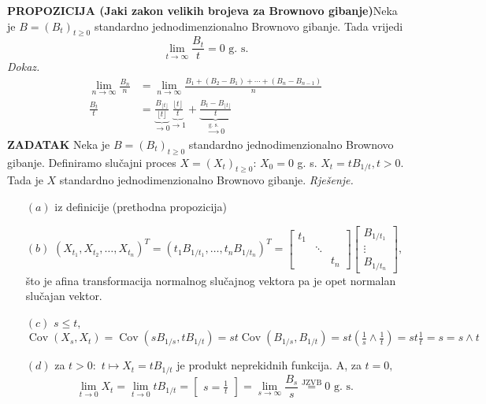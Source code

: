 \documentclass{article}
\newcommand{\Cov}{\operatorname{Cov}}
\begin{document}
\textbf{PROPOZICIJA (Jaki zakon velikih brojeva za Brownovo gibanje)}\newline Neka je \(B=(B_t)_{t\ge0}\) standardno jednodimenzionalno Brownovo gibanje. Tada vrijedi \[\lim_{t\to\infty}\frac{B_t}t=0\text{ g. s.}\]
\textit{Dokaz.} \[\begin{aligned}\lim_{n\to\infty}\frac{B_n}n&=\lim_{n\to\infty}\frac{B_1+(B_2-B_1)+\cdots+(B_n-B_{n-1})}n\\\frac{B_t}t&=\underbrace{\frac{B_{\lfloor t\rfloor}}{\lfloor t\rfloor}}_{\to0}\underbrace{\frac{\lfloor t\rfloor}t}_{\to1}+\underbrace{\frac{B_t-B_{\lfloor t\rfloor}}t}_{\overset{\text{g. s.}}{\longrightarrow}0
}\end{aligned}\]
\textbf{ZADATAK}\newline
Neka je \(B=(B_t)_{t\ge0}\) standardno jednodimenzionalno Brownovo gibanje. Definiramo slučajni proces \(X=(X_t)_{t\ge0}\): \(X_0=0\) g. s. \(X_t=tB_{1/t},t>0.\) Tada je \(X\) standardno jednodimenzionalno Brownovo gibanje.\newline\newline
\textit{Rješenje.}
\begin{enumerate}
    \item[\((a)\)] iz definicije (prethodna propozicija)
    \item[\((b)\)] \((X_{t_1},X_{t_2},\ldots,X_{t_n})^T=(t_1B_{1/t_1},\ldots,t_nB_{1/t_n})^T=\begin{bmatrix}t_1&&\\&\ddots&\\&&t_n\end{bmatrix}\begin{bmatrix}B_{1/t_1}\\\vdots\\B_{1/t_n}\end{bmatrix},\) što je afina transformacija normalnog slučajnog vektora pa je opet normalan slučajan vektor.
    \item[\((c)\)] \(s\le t,\) \(\Cov(X_s,X_t)=\Cov(sB_{1/s},tB_{1/t})=st\Cov(B_{1/s},B_{1/t})=st\left(\frac1s\land\frac1t\right)=st\frac1t=s=s\land t\)
    \item[\((d)\)] za \(t>0:\) \(t\mapsto X_t=tB_{1/t}\) je produkt neprekidnih funkcija. A, za \(t=0,\) \[\lim_{t\to0}X_t=\lim_{t\to0}tB_{1/t}=\begin{bmatrix}s=\frac1t\end{bmatrix}=\lim_{s\to\infty}\frac{B_s}s\overset{\text{JZVB}}{=}0\text{ g. s.}\]
\end{enumerate}
\end{document}

